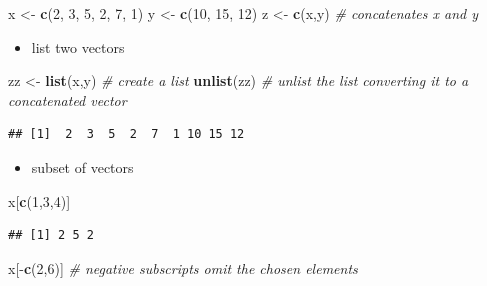 \documentclass[]{article}
\def\tightlist{}
\newenvironment{Shaded}{\begin{snugshade}}{\end{snugshade}}
\newcommand{\KeywordTok}[1]{\textcolor[rgb]{0.13,0.29,0.53}{\textbf{{#1}}}}
\newcommand{\DecValTok}[1]{\textcolor[rgb]{0.00,0.00,0.81}{{#1}}}
\newcommand{\StringTok}[1]{\textcolor[rgb]{0.31,0.60,0.02}{{#1}}}
\newcommand{\CommentTok}[1]{\textcolor[rgb]{0.56,0.35,0.01}{\textit{{#1}}}}
\newcommand{\NormalTok}[1]{{#1}}
\numberwithin{equation}{section}
\begin{document}
\begin{Shaded}
\begin{Highlighting}[]
\NormalTok{x <-}\StringTok{ }\KeywordTok{c}\NormalTok{(}\DecValTok{2}\NormalTok{, }\DecValTok{3}\NormalTok{, }\DecValTok{5}\NormalTok{, }\DecValTok{2}\NormalTok{, }\DecValTok{7}\NormalTok{, }\DecValTok{1}\NormalTok{)}
\NormalTok{y <-}\StringTok{ }\KeywordTok{c}\NormalTok{(}\DecValTok{10}\NormalTok{, }\DecValTok{15}\NormalTok{, }\DecValTok{12}\NormalTok{)}
\NormalTok{z <-}\StringTok{ }\KeywordTok{c}\NormalTok{(x,y)  }\CommentTok{# concatenates x and y}
\end{Highlighting}
\end{Shaded}

\begin{itemize}
\tightlist
\item
  list two vectors
\end{itemize}

\begin{Shaded}
\begin{Highlighting}[]
\NormalTok{zz <-}\StringTok{ }\KeywordTok{list}\NormalTok{(x,y) }\CommentTok{# create a list}
\KeywordTok{unlist}\NormalTok{(zz) }\CommentTok{# unlist the list converting it to a concatenated vector}
\end{Highlighting}
\end{Shaded}

\begin{verbatim}
## [1]  2  3  5  2  7  1 10 15 12
\end{verbatim}

\begin{itemize}
\tightlist
\item
  subset of vectors
\end{itemize}

\begin{Shaded}
\begin{Highlighting}[]
\NormalTok{x[}\KeywordTok{c}\NormalTok{(}\DecValTok{1}\NormalTok{,}\DecValTok{3}\NormalTok{,}\DecValTok{4}\NormalTok{)]}
\end{Highlighting}
\end{Shaded}

\begin{verbatim}
## [1] 2 5 2
\end{verbatim}

\begin{Shaded}
\begin{Highlighting}[]
\NormalTok{x[-}\KeywordTok{c}\NormalTok{(}\DecValTok{2}\NormalTok{,}\DecValTok{6}\NormalTok{)] }\CommentTok{# negative subscripts omit the chosen elements }
\end{Highlighting}
\end{Shaded}
\end{document}
